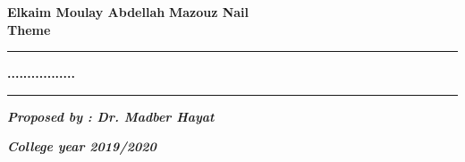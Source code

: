 \documentclass[english,a4,12pt]{report}
\begin{document}
\begin{titlepage}
\begin{center}
            {\bfseries Elkaim Moulay Abdellah }{\hspace*{5cm}}{\bfseries Mazouz  Nail}   \\
            \vspace{1cm}
            \Large {\bfseries Theme }
        \end{center}
        \begin{center}
            \hrule width 460pt
            \bigskip
            \Large  \centering \textbf{ \textsc{ ................. } }
            \bigskip
            \hrule width 460pt
        \end{center}
        \raggedright
        \bigskip
        \vspace{1cm}
        \textit{\bfseries Proposed by : Dr. Madber Hayat }
        \vspace{2cm}
        \begin{center}
            \textit{\bfseries College year 2019/2020}
        \end{center}
    \end{titlepage}

\end{document}
